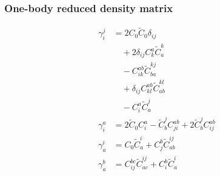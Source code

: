 \subsubsection{One-body reduced density matrix}
\begin{align*}
\gamma^{j}_{i} &= 2 C_{0} \widetilde{C}_{0} \delta_{i j}  \\
  &\quad  + 2 \delta_{i j} C^{a}_{k}  \widetilde{C}^{k}_{a}  \\
  &\quad - C^{ab}_{ik}  \widetilde{C}^{kj}_{ba}  \\
  &\quad  + \delta_{i j} C^{ab}_{kl}  \widetilde{C}^{kl}_{ab}  \\
  &\quad - C^{a}_{i}  \widetilde{C}^{j}_{a} \\
\gamma^{a}_{i} &= 2 \widetilde{C}_{0} C^{a}_{i}  - \widetilde{C}^{j}_{b}  C^{ab}_{ji}   + 2 \widetilde{C}^{j}_{b}  C^{ab}_{ij} \\
\gamma^{i}_{a} &= C_{0} \widetilde{C}^{i}_{a}   + C^{b}_{j}  \widetilde{C}^{ij}_{ab} \\
\gamma^{b}_{a} &= C^{bc}_{ij}  \widetilde{C}^{ij}_{ac}   + C^{b}_{i}  \widetilde{C}^{i}_{a}
\end{align*}

